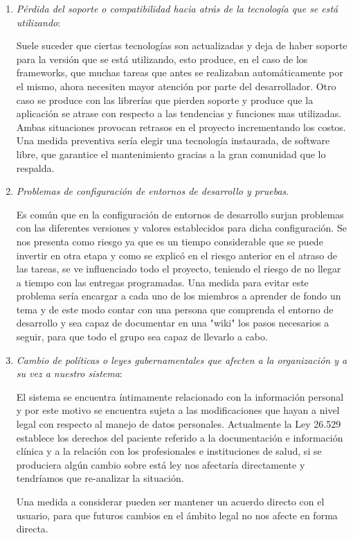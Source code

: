 \begin{enumerate}
\item \textit{Pérdida del soporte o compatibilidad hacia atrás de la tecnología que se está utilizando}:

Suele suceder que ciertas tecnologías son actualizadas y deja de haber soporte para la versión que se está utilizando, esto produce, en el caso de los frameworks, que muchas  tareas que antes se realizaban automáticamente por el mismo, ahora necesiten mayor atención por parte del desarrollador. Otro caso se produce con las librerías que pierden soporte y produce que la aplicación se atrase con respecto a las tendencias y funciones mas utilizadas. Ambas situaciones provocan retrasos en el proyecto incrementando los costos. Una medida preventiva sería elegir una tecnología instaurada,  de software libre, que garantice el mantenimiento gracias a la gran comunidad que lo respalda.

\item \textit{Problemas de configuración de entornos de desarrollo y pruebas}.

Es común que en la configuración de  entornos de desarrollo surjan problemas con las diferentes versiones y valores establecidos para dicha configuración. Se nos presenta como riesgo ya que es un tiempo considerable que se puede invertir en otra etapa y como se explicó en el riesgo anterior en el atraso de las tareas, se ve influenciado todo el proyecto, teniendo el riesgo de no llegar a tiempo con las entregas programadas. Una medida para evitar este problema sería encargar a cada uno de los miembros a aprender de fondo un tema y de este modo contar con una persona que comprenda el entorno de desarrollo y sea capaz de documentar en una "wiki" los pasos necesarios a seguir, para que todo el grupo sea capaz de llevarlo a cabo.

\item \textit{Cambio de políticas o leyes gubernamentales que afecten a la organización y a su vez a nuestro sistema}:

El sistema se encuentra íntimamente relacionado con la información personal y por este motivo se encuentra sujeta a las modificaciones que hayan a nivel legal con respecto al manejo de datos personales. Actualmente  la Ley 26.529 establece los derechos del paciente referido a la documentación e información clínica y a la relación con los profesionales e instituciones de salud, si se produciera algún cambio sobre está ley nos afectaría directamente y tendríamos que re-analizar la situación.

Una medida a considerar pueden ser mantener un acuerdo directo con el usuario, para que futuros cambios en el ámbito legal no nos afecte en forma directa.


\end{enumerate}
